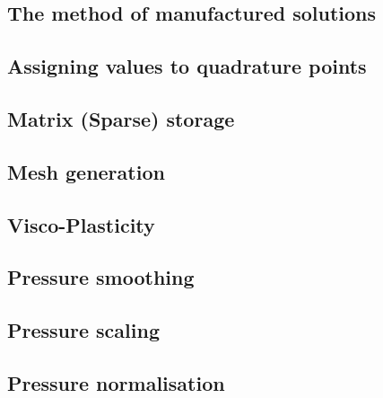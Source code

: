 \documentclass[a4paper]{article}
\begin{document}
\newpage %
\subsection{The method of manufactured solutions}  %
\newpage %
\subsection{Assigning values to quadrature points}  %
\newpage %
\subsection{Matrix (Sparse) storage}  %
\newpage %
\subsection{Mesh generation} \label{subsection_meshes}  %
\newpage %
\subsection{Visco-Plasticity}  %
\newpage %
\subsection{Pressure smoothing}  %
\newpage %
\subsection{Pressure scaling}  %
\newpage %
\subsection{Pressure normalisation}  %
\newpage %
\end{document}
